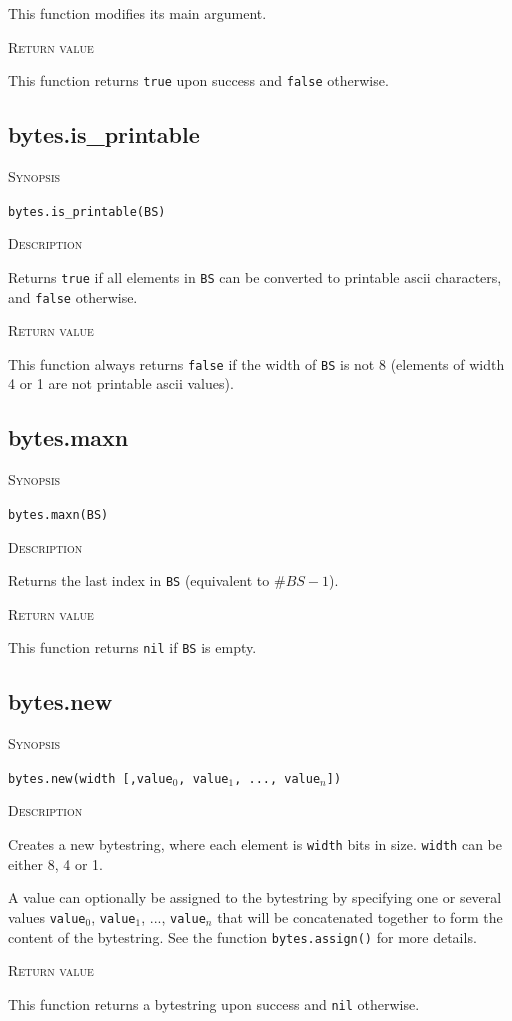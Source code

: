 \documentclass[11pt]{report}
\newcommand{\mansection}[1]{\vspace{0.5em}\par\noindent\textsc{#1}\vspace{0.5em}\par}
\newcommand{\syn}[1]{\texttt{#1}}
\begin{document}
  This function modifies its main argument.
\mansection{Return value}
  This function returns \syn{true} upon success and \syn{false} otherwise.


\subsection{bytes.is\_printable}

\mansection{Synopsis}
\syn{bytes.is\_printable(BS)}

\mansection{Description}
  Returns \syn{true} if all elements in \syn{BS} can be converted to 
  printable ascii characters, and \syn{false} otherwise.

\mansection{Return value}
  This function always returns \syn{false} if the width of \syn{BS} is 
  not 8 (elements of width 4 or 1 are not printable ascii values).  


\subsection{bytes.maxn}

\mansection{Synopsis}
\syn{bytes.maxn(BS)}

\mansection{Description}
  Returns the last index in \syn{BS} (equivalent to $\#BS-1$).
\mansection{Return value}
  This function returns \syn{nil} if \syn{BS} is empty.


\subsection{bytes.new}

\mansection{Synopsis}
\syn{bytes.new(width [,\syn{value$_0$}, \syn{value$_1$}, ..., \syn{value$_n$}])}

\mansection{Description}
  Creates a new bytestring, where each element is \syn{width} bits in size.
  \syn{width} can be either 8, 4 or 1.

  A value can optionally be assigned to the bytestring by specifying one or 
  several values \syn{value$_0$}, \syn{value$_1$}, ..., \syn{value$_n$} that will be concatenated
  together to form the content of the bytestring. See the function 
  \syn{bytes.assign()} for more details.
\mansection{Return value}
  This function returns a bytestring upon success and \syn{nil} otherwise. 


\end{document}

